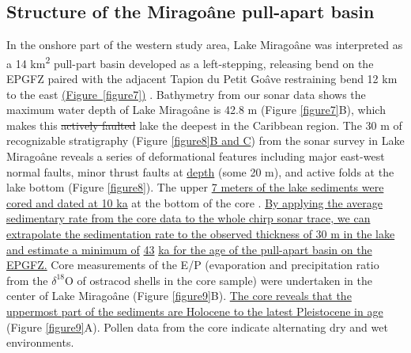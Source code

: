 \documentclass[linenumbers,draft]{agujournal}
\begin{document}
\subsection{Structure of the Mirago\^ane pull-apart basin}
In the onshore part of the western study area, Lake Mirago\^ane was interpreted as a 14 km\textsuperscript{2} pull-part basin developed as a left-stepping, releasing bend on the EPGFZ paired with the adjacent Tapion du Petit Go\^ave restraining bend 12 km to the east \ul{(Figure~{\ref{figure7}})} \citep{cowgill2012interactive}. Bathymetry from our sonar data shows the maximum water depth of Lake Mirago\^ane is 42.8 m (Figure \ref{figure7}B), which makes this \st{actively faulted} lake the deepest \citep{higuera199910} in the Caribbean region. The 30 m of recognizable stratigraphy (Figure \ref{figure8}\ul{B and C}) from the sonar survey in Lake Mirago\^ane reveals a series of deformational features including major east-west normal faults, minor thrust faults at \ul{depth} (some 20 m), and active folds at the lake bottom (Figure \ref{figure8}). The upper \ul{7 meters of the lake sediments were cored and dated at 10 ka} at the bottom of the core \underline{\citep{higuera199910}}. \ul{By applying the average sedimentary rate from the core data to the whole chirp sonar trace, we can extrapolate the sedimentation rate to the observed thickness of 30 m in the lake and estimate a minimum of} \ul{43} \ul{ka for the age of the pull-apart basin on the EPGFZ.} Core measurements of the E/P (evaporation and precipitation ratio from the $\delta^{18}$O of ostracod shells in the core sample) were undertaken \citep{higuera199910} in the center of Lake Mirago\^ane (Figure \ref{figure9}B). \ul{The core reveals that the uppermost part of the sediments are Holocene to the latest Pleistocene in age} (Figure \ref{figure9}A). Pollen data from the core indicate alternating dry and wet environments.
\end{document}
